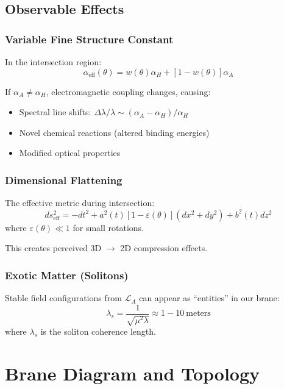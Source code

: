 \subsection{Observable Effects}

\subsubsection{Variable Fine Structure Constant}

In the intersection region:
\begin{equation}
\alpha_{\text{eff}}(\theta) = w(\theta)\alpha_H + [1-w(\theta)]\alpha_A
\end{equation}

If $\alpha_A \neq \alpha_H$, electromagnetic coupling changes, causing:
\begin{itemize}
\item Spectral line shifts: $\Delta\lambda/\lambda \sim (\alpha_A - \alpha_H)/\alpha_H$
\item Novel chemical reactions (altered binding energies)
\item Modified optical properties
\end{itemize}

\subsubsection{Dimensional Flattening}

The effective metric during intersection:
\begin{equation}
ds^2_{\text{eff}} = -dt^2 + a^2(t)[1-\varepsilon(\theta)](dx^2+dy^2) + b^2(t)dz^2
\end{equation}
where $\varepsilon(\theta) \ll 1$ for small rotations.

This creates perceived 3D $\rightarrow$ 2D compression effects.

\subsubsection{Exotic Matter (Solitons)}

Stable field configurations from $\mathcal{L}_A$ can appear as ``entities'' in our brane:
\begin{equation}
\lambda_s = \frac{1}{\sqrt{\mu^2\lambda}} \approx 1-10\ \text{meters}
\end{equation}
where $\lambda_s$ is the soliton coherence length.

\section{Brane Diagram and Topology}

